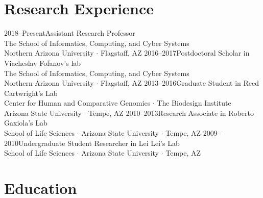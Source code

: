 \documentclass[]{cv-style}          %
\begin{document}
 
\section{Research Experience}
\begin{entrylist}
{2018--Present}{Assistant Research Professor}
{\\The School of Informatics, Computing, and Cyber Systems\\Northern Arizona University $\cdotp$ Flagstaff, AZ}{\vspace{-0.3cm}}
{2016--2017}{Postdoctoral Scholar {\normalfont in Viacheslav Fofanov's lab}}
{\\The School of Informatics, Computing, and Cyber Systems\\Northern Arizona University $\cdotp$ Flagstaff, AZ}{\vspace{-0.3cm}}
{2013--2016}{Graduate Student {\normalfont in Reed Cartwright's Lab}}
{\\Center for Human and Comparative Genomics $\cdotp$ The Biodesign Institute\\Arizona State University $\cdotp$ Tempe, AZ}{\vspace{-0.3cm}}
{2010--2013}{Research Associate {\normalfont in Roberto Gaxiola's Lab}}
{\\School of Life Sciences $\cdotp$ Arizona State University $\cdotp$ Tempe, AZ} 
{\vspace{-0.3cm}}
{2009--2010}{Undergraduate Student Researcher {\normalfont in Lei Lei's Lab}}
{\\School of Life Sciences $\cdotp$ Arizona State University $\cdotp$ Tempe, AZ}
{\vspace{-0.3cm}}
\end{entrylist}
 
\section{Education}
  
\end{document}
